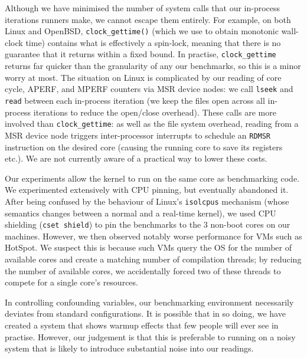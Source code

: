 \documentclass[preprint,numbers,10pt]{sigplanconf}
\begin{document}
Although we have minimised the number of system calls that our in-process
iterations runners make, we cannot escape them entirely. For example,
on both Linux and OpenBSD, \texttt{clock\_gettime()} (which we use to obtain
monotonic wall-clock time) contains what is effectively a spin-lock,
meaning that there is no guarantee that it returns within a fixed bound.
In practise, \texttt{clock\_gettime} returns far quicker than the granularity
of any our benchmarks, so this is a minor worry at most. \label{aperf/mperf error} The situation
on Linux is complicated by our reading of core cycle, APERF, and MPERF
counters via MSR device nodes: we call \texttt{lseek} and \texttt{read}
between each in-process iteration (we keep the files open across all
in-process iterations to reduce the open/close overhead).
These calls are more involved than \texttt{clock\_gettime}:
as well as the file system overhead, reading from a MSR device
node triggers inter-processor interrupts to schedule an \texttt{RDMSR}
instruction on the desired core (causing the running core to save its registers etc.).
We are not currently aware of a practical way to lower these costs.

Our experiments allow the kernel to run on the same core as benchmarking code.
We experimented extensively with CPU pinning, but eventually abandoned it. After
being confused by the behaviour of Linux's \texttt{isolcpus} mechanism (whose
semantics changes between a normal and a real-time kernel), we used CPU shielding
(\texttt{cset shield}) to pin the benchmarks to the 3 non-boot cores on our
machines. However, we then observed notably worse performance for VMs such as
HotSpot. We suspect this is because such VMs query the OS for the number of
available cores and create a matching number of compilation threads; by reducing
the number of available cores, we accidentally forced two of these threads to
compete for a single core's resources.

In controlling confounding variables, our benchmarking environment necessarily
deviates from standard configurations. It is possible that in so doing, we have
created a system that shows warmup effects that few people will ever see in
practise. However, our judgement is that this is preferable to running on a
noisy system that is likely to introduce substantial noise into our readings.
\end{document}
